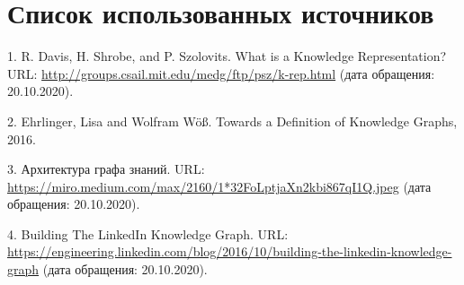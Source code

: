 \usepackage{hyperref}%
\clearpage                                  %
\chapter*{Список использованных источников}	
\label{references}




1. R. Davis, H. Shrobe, and P. Szolovits. What is a Knowledge Representation? URL: \url{http://groups.csail.mit.edu/medg/ftp/psz/k-rep.html} (дата обращения: 20.10.2020).

2. Ehrlinger, Lisa and Wolfram Wöß. Towards a Definition of Knowledge Graphs, 2016.

3. Архитектура графа знаний. URL: \url{https://miro.medium.com/max/2160/1*32FoLptjaXn2kbi867qI1Q.jpeg} (дата обращения: 20.10.2020).

4. Building The LinkedIn Knowledge Graph. URL: \url{https://engineering.linkedin.com/blog/2016/10/building-the-linkedin-knowledge-graph} (дата обращения: 20.10.2020).

